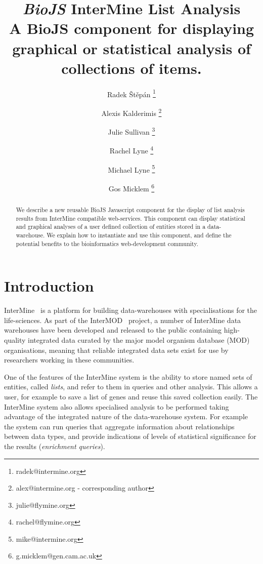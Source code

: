 \documentclass[10pt,a4paper,twocolumn]{article}
\begin{document}
\title{\textit{BioJS} InterMine List Analysis \\
\small{A BioJS component for displaying graphical or statistical analysis of collections of items.}}

\author[1]{Radek Štěpán \thanks{radek@intermine.org}}
\author[1]{Alexis Kalderimis \thanks{alex@intermine.org - corresponding author}}
\author[1]{Julie Sullivan \thanks{julie@flymine.org}}
\author[1]{Rachel Lyne \thanks{rachel@flymine.org}}
\author[1]{Michael Lyne \thanks{mike@intermine.org}}
\author[1]{Gos Micklem \thanks{g.micklem@gen.cam.ac.uk}}

\maketitle
\thispagestyle{fancy}

\begin{abstract}

We describe a new reusable BioJS Javascript component for the display of list
analysis results from InterMine compatible web-services. This component can display
statistical and graphical analyses of a user defined collection of entities stored
in a data-warehouse. We explain how to instantiate and use this component, and
define the potential benefits to the bioinformatics web-development community.

\end{abstract}
\clearpage

\section*{Introduction}

InterMine~\cite{intermine} is a platform for building data-warehouses with 
specialisations for the life-sciences. As part of the InterMOD~\cite{intermod}
project, a number of InterMine data warehouses have been developed and released
to the public containing high-quality integrated data curated by the major model
organism database (MOD) organisations, meaning that reliable integrated data sets
exist for use by researchers working in these communities.

One of the features of
the InterMine system is the ability to store named sets of entities, called \emph{lists},
and refer to them in queries and other analysis. This allows a user, for example to save
a list of genes and reuse this saved collection easily. The InterMine system also
allows specialised analysis to be performed taking advantage of the integrated
nature of the data-warehouse system. For example the system can run queries that aggregate
information about relationships between data types, and provide indications of levels
of statistical significance for the results (\emph{enrichment queries}).
\end{document}
